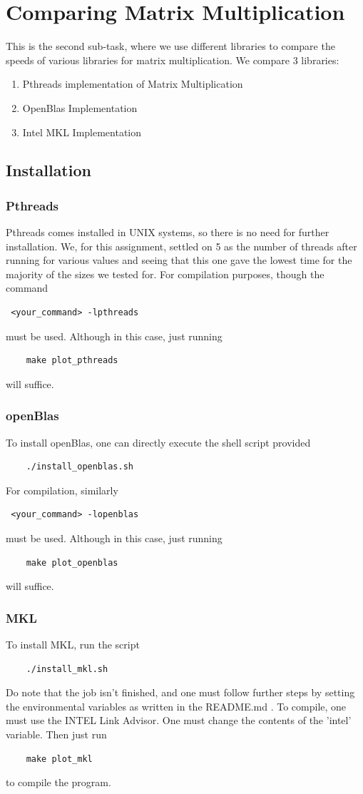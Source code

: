 \documentclass[a4paper]{article}
\begin{document}
\section{Comparing Matrix Multiplication}
This is the second sub-task, where we use different libraries to compare the speeds of various libraries for matrix multiplication. We compare 3 libraries:
\begin{enumerate}
\item Pthreads implementation of Matrix Multiplication
\item OpenBlas Implementation
\item Intel MKL Implementation
\end{enumerate}
\subsection{Installation}
\subsubsection{Pthreads}
Pthreads comes installed in UNIX systems, so there is no need for further installation. We, for this assignment, settled on 5 as the number of threads after running for various values and seeing that this one gave the lowest time for the majority of the sizes we tested for. For compilation purposes, though the command 
\begin{verbatim} <your_command> -lpthreads \end{verbatim}
must be used. Although in this case, just running
\begin{verbatim}
    make plot_pthreads
\end{verbatim}
will suffice.
\subsubsection{openBlas}
To install openBlas, one can directly execute the shell script provided
\begin{verbatim}
    ./install_openblas.sh
\end{verbatim}
For compilation, similarly
\begin{verbatim} <your_command> -lopenblas \end{verbatim}
must be used. Although in this case, just running
\begin{verbatim}
    make plot_openblas
\end{verbatim}
will suffice.
\subsubsection{MKL}
To install MKL, run the script \cite{mklinstall}
\begin{verbatim}
    ./install_mkl.sh
\end{verbatim}
Do note that the job isn't finished, and one must follow further steps by setting the environmental variables as written in the README.md \cite{envvar}.
To compile, one must use the INTEL Link Advisor\cite{intellink}. One must change the contents of the 'intel' variable. Then just run
\begin{verbatim}
    make plot_mkl
\end{verbatim} to compile the program.
\end{document}
